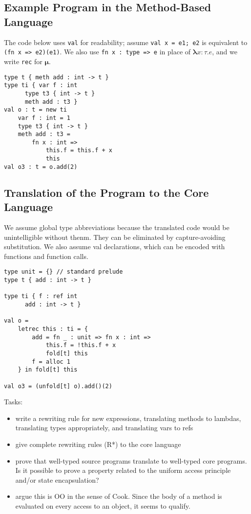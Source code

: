 \newpage 

\subsection{Example Program in the Method-Based Language}

The code below uses \lstinline!val! for readability; assume \lstinline!val x = e1; e2! is equivalent to \lstinline!(fn x => e2)(e1)!.  We also use \lstinline!fn x : type => e! in place of $\boldsymbol\lambda x{:}\tau . e$, and we write \lstinline!rec! for $\boldsymbol\mu$.

\begin{lstlisting}
type t { meth add : int -> t }
type ti { var f : int
	  type t3 { int -> t }
	  meth add : t3 }
val o : t = new ti
	var f : int = 1
	type t3 { int -> t }
	meth add : t3 =
		fn x : int =>
			this.f = this.f + x
			this
val o3 : t = o.add(2)
\end{lstlisting}


\subsection{Translation of the Program to the Core Language}

We assume global type abbreviations because the translated code would be unintelligible without thenm.  They can be eliminated by capture-avoiding substitution.  We also assume val declarations, which can be encoded with functions and function calls.

\begin{lstlisting}
type unit = {} // standard prelude
type t { add : int -> t }
	
type ti { f : ref int
	  add : int -> t }
	
val o =
	letrec this : ti = {
		add = fn _ : unit => fn x : int =>
			this.f = !this.f + x
			fold[t] this
		f = alloc 1
	} in fold[t] this

val o3 = (unfold[t] o).add()(2)
\end{lstlisting}

Tasks:

\begin{itemize}

 \item write a rewriting rule for new expressions, translating methods to lambdas, translating types appropriately, and translating vars to refs
 \item give complete rewriting rules (R*) to the core language
 \item prove that well-typed source programs translate to well-typed core programs.  Is it possible to prove a property related to the uniform access principle and/or state encapsulation?
 \item argue this is OO in the sense of Cook.  Since the body of a method is evaluated on every access to an object, it seems to qualify.
\end{itemize}

